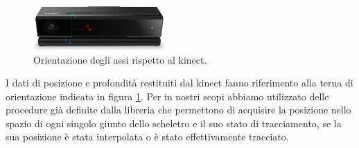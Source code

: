\documentclass[10pt,a4paper]{article}
\begin{document}
\begin{figure}
	\vspace{-15pt}
  	\centering
   	\includegraphics[width=0.45\textwidth]{kin_axis.png}
  	\vspace{-13pt}
  	\caption{Orientazione degli assi rispetto al kinect.}
  	\label{fig:kinaxis1}
  	\vspace{-15pt}
\end{figure}

\noindent
I dati di posizione e profondit\`a restituiti dal kinect fanno riferimento alla terna di orientazione indicata in figura \ref{fig:kinaxis1}. Per in nostri scopi abbiamo utilizzato delle procedure gi\`a definite dalla libreria che permettono di acquisire la posizione nello spazio di ogni singolo giunto dello scheletro e il suo stato di tracciamento, se la sua posizione \`e stata interpolata o \`e stato effettivamente tracciato.
\end{document}
